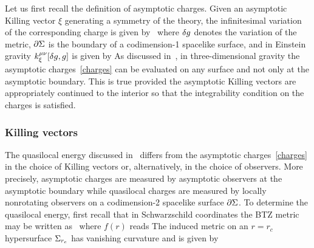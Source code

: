 \documentclass[11pt,a4paper]{article}
\begin{document}
	Let us first recall the definition of asymptotic charges. Given an asymptotic Killing vector $\xi$ generating a symmetry of the theory, the infinitesimal variation of the corresponding charge is given by~\cite{Barnich:2001jy}
	where $\d g$ denotes the variation of the metric, $\p \ss$ is the boundary of a codimension-1 spacelike surface, and  in Einstein gravity $k_\xi^{\mu\nu} [\d g, g]$ is given by
	As discussed in~\cite{Compere:2015knw}, in three-dimensional gravity the asymptotic charges~\eqref{charges} can be evaluated on any surface and not only at the asymptotic boundary. This is true provided the asymptotic Killing vectors are appropriately continued to the interior so that the integrability condition on the charges is satisfied. 
	
\subsubsection*{Killing vectors}
	
	The quasilocal energy discussed in~\cite{Brown:1994gs} differs from the asymptotic charges~\eqref{charges} in the choice of Killing vectors or, alternatively, in the choice of observers. More precisely, asymptotic charges are measured by asymptotic observers at the asymptotic boundary while quasilocal charges are measured by locally nonrotating observers on a codimension-2 spacelike surface $\p\Sigma$. To determine the quasilocal energy, first recall that in Schwarzschild coordinates the BTZ metric may be written as~\cite{Banados:1992wn}
	where $f(r)$ reads
	The induced metric on an $r = r_c$ hypersurface $\ss_{r_c}$ has vanishing curvature and is given by
	
\end{document}
